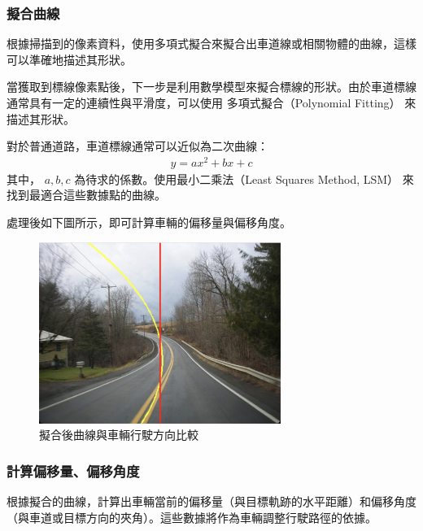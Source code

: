 \documentclass[12pt]{article}       %
\begin{document}
\subsubsection{擬合曲線}
\hspace{2em}根據掃描到的像素資料，使用多項式擬合來擬合出車道線或相關物體的曲線，這樣可以準確地描述其形狀。

當獲取到標線像素點後，下一步是利用數學模型來擬合標線的形狀。由於車道標線通常具有一定的連續性與平滑度，可以使用 多項式擬合（Polynomial Fitting） 來描述其形狀。

\hspace{2em}對於普通道路，車道標線通常可以近似為二次曲線： \begin{align} y = ax^2 + bx + c \end{align} 其中，
$a,b,c$ 為待求的係數。使用最小二乘法（Least Squares Method, LSM） 來找到最適合這些數據點的曲線。

處理後如下圖所示，即可計算車輛的偏移量與偏移角度。
\begin{figure}[H]
    \centering
    \includegraphics[width=0.7\textwidth]{8.png}     %
    \caption{擬合後曲線與車輛行駛方向比較}    %
    \label{fig:8}    %
\end{figure}

\subsubsection{計算偏移量、偏移角度}
\hspace{2em}根據擬合的曲線，計算出車輛當前的偏移量（與目標軌跡的水平距離）和偏移角度（與車道或目標方向的夾角）。這些數據將作為車輛調整行駛路徑的依據。
\end{document}

